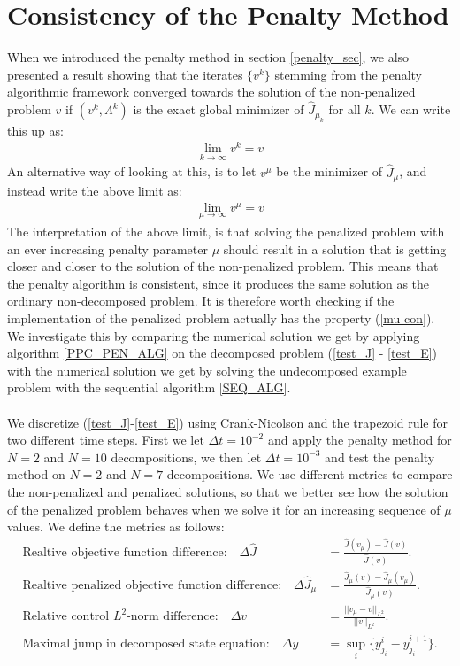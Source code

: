 \section{Consistency of the Penalty Method} \label{consistency_sec}
When we introduced the penalty method in section \ref{penalty_sec}, we also presented a result showing that the iterates $\{v^k\}$ stemming from the penalty algorithmic framework converged towards the solution of the non-penalized problem $v$ if $(v^k,\Lambda^k)$ is the exact global minimizer of $\hat J_{\mu_k}$ for all $k$. We can write this up as:
\begin{align*}
\lim_{k\rightarrow\infty} v^k = v 
\end{align*}  
An alternative way of looking at this, is to let $v^{\mu}$ be the minimizer of $\hat J_{\mu}$, and instead write the above limit as:
\begin{align}
\lim_{\mu\rightarrow\infty} v^{\mu} = v \label{mu con}
\end{align}
The interpretation of the above limit, is that solving the penalized problem with an ever increasing penalty parameter $\mu$ should result in a solution that is getting closer and closer to the solution of the non-penalized problem. This means that the penalty algorithm is consistent, since it produces the same solution as the ordinary non-decomposed problem. It is therefore worth checking if the implementation of the penalized problem actually has the property (\ref{mu con}). We investigate this by comparing the numerical solution we get by applying algorithm \ref{PPC_PEN_ALG} on the decomposed problem (\ref{test_J} - \ref{test_E}) with the numerical solution we get by solving the undecomposed example problem with the sequential algorithm \ref{SEQ_ALG}. 
\\
\\
We discretize (\ref{test_J}-\ref{test_E}) using Crank-Nicolson and the trapezoid rule for two different time steps. First we let $\Delta t = 10^{-2}$ and apply the penalty method for $N=2$ and $N=10$ decompositions, we then let $\Delta t = 10^{-3}$ and test the penalty method on $N=2$ and $N=7$ decompositions. We use different metrics to compare the non-penalized and penalized solutions, so that we better see how the solution of the penalized problem behaves when we solve it for an increasing sequence of $\mu$ values. We define the metrics as follows:
\begin{align}
\textrm{Realtive objective function difference:}\quad \Delta \hat J &= \frac{\hat{J}(v_{\mu})-\hat{J}(v)}{\hat{J}(v)}.\label{mes1}\\
\textrm{Realtive penalized objective function difference:}\quad \Delta \hat J_{\mu} &= \frac{\hat{J}_{\mu}(v)-\hat{J}_{\mu}(v_{\mu})}{\hat{J}_{\mu}(v)}.\\
\textrm{Relative control $L^2$-norm difference:}\quad \Delta v&=\frac{||v_{\mu}-v||_ {L^2}}{||v||_{L^2}}. \\
\textrm{Maximal jump in decomposed state equation:}\quad \Delta y&= \sup_i\{y_{j_i}^i-y_{j_i}^{i+1}\}.\label{mes4}
\end{align}
